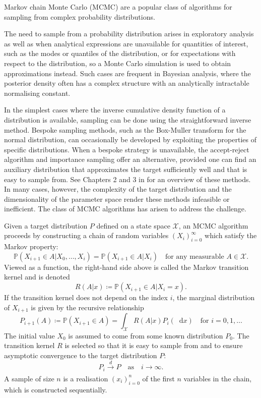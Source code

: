 \documentclass[11pt,a4paper]{report}
\newcommand*\diff{\mathop{}\!\mathrm{d}}
\begin{document}
Markov chain Monte Carlo (MCMC) are a popular class of algorithms for sampling from complex probability distributions.

The need to sample from a probability distribution arises in exploratory analysis as well as when analytical expressions are unavailable for quantities of interest, such as the modes or quantiles of the distribution, or for expectations with respect to the distribution, so a Monte Carlo simulation is used to obtain approximations instead. Such cases are frequent in Bayesian analysis, where the posterior density often has a complex structure with an analytically intractable normalising constant.

In the simplest cases where the inverse cumulative density function of a distribution is available, sampling can be done using the straightforward inverse method. Bespoke sampling methods, such as the Box-Muller transform for the normal distribution, can occasionally be developed by exploiting the properties of specific distributions. When a bespoke strategy is unavailable, the accept-reject algorithm and importance sampling offer an alternative, provided one can find an auxiliary distribution that approximates the target sufficiently well and that is easy to sample from. See Chapters 2 and 3 in \cite{robertMonteCarloStatistical2004} for an overview of these methods. In many cases, however, the complexity of the target distribution and the dimensionality of the parameter space render these methods infeasible or inefficient. The class of MCMC algorithms has arisen to address the challenge.

Given a target distribution $P$ defined on a state space $\mathcal{X}$, an MCMC algorithm proceeds by constructing a chain of random variables $(X_i)_{i=0}^\infty$  which satisfy the Markov property:
\begin{equation*}
\mathbb{P}(X_{i+1}\in A | X_0, \dots, X_i) = \mathbb{P}(X_{i+1}\in A | X_i) \quad\text{for any measurable } A \in \mathcal{X}.
\end{equation*}
Viewed as a function, the right-hand side above is called the Markov transition kernel and is denoted 
\begin{equation}
R(A | x) \coloneq \mathbb{P}(X_{i+1}\in A | X_i = x).
\end{equation}
If the transition kernel does not depend on the index $i$, the marginal distribution of $X_{i+1}$ is given by the recursive relationship
\begin{equation*}
P_{i+1}(A) \coloneq \mathbb{P}(X_{i+1} \in A) = \int_{\mathcal{X}} R(A|x) P_i(\diff x) \quad\text{for } i = 0, 1, \dots
\end{equation*}
The initial value $X_0$ is assumed to come from some known distribution $P_0$.
The transition kernel $R$ is selected so that it is easy to sample from and to ensure asymptotic convergence to the target distribution $P$:
\begin{equation*}
P_i \xrightarrow[]{d} P \quad\text{as}\quad i \to \infty.
\end{equation*}
A sample of size $n$ is a realisation $(x_i)_{i=0}^n$ of the first $n$ variables in the chain, which is constructed sequentially.
\end{document}
